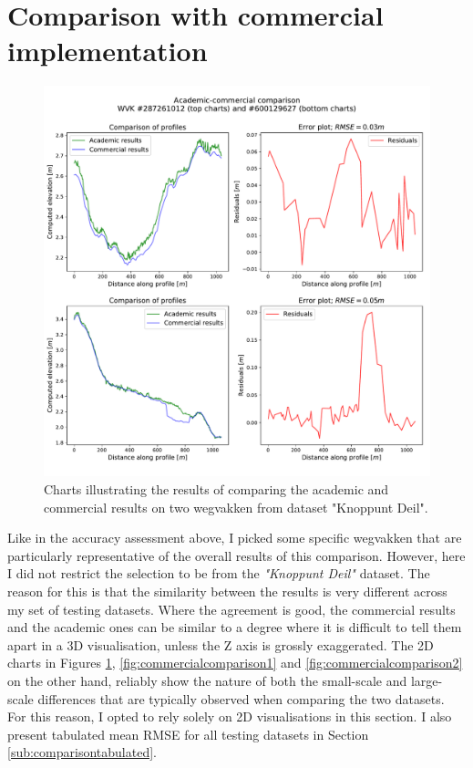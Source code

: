 \section{Comparison with commercial implementation}
\label{sec:comparison}

\begin{figure}[]
    \centering
    \includegraphics[width=0.9\linewidth]{final_report/figs/commercialcomparison0.pdf}
    \caption{Charts illustrating the results of comparing the academic and commercial results on two wegvakken from dataset "Knoppunt Deil".}
    \label{fig:commercialcomparison0}
\end{figure}

Like in the accuracy assessment above, I picked some specific wegvakken that are particularly representative of the overall results of this comparison. However, here I did not restrict the selection to be from the \textit{"Knoppunt Deil"} dataset. The reason for this is that the similarity between the results is very different across my set of testing datasets. Where the agreement is good, the commercial results and the academic ones can be similar to a degree where it is difficult to tell them apart in a 3D visualisation, unless the Z axis is grossly exaggerated. The 2D charts in Figures \ref{fig:commercialcomparison0}, \ref{fig:commercialcomparison1} and \ref{fig:commercialcomparison2} on the other hand, reliably show the nature of both the small-scale and large-scale differences that are typically observed when comparing the two datasets. For this reason, I opted to rely solely on 2D visualisations in this section. I also present tabulated mean RMSE for all testing datasets in Section \ref{sub:comparisontabulated}.

